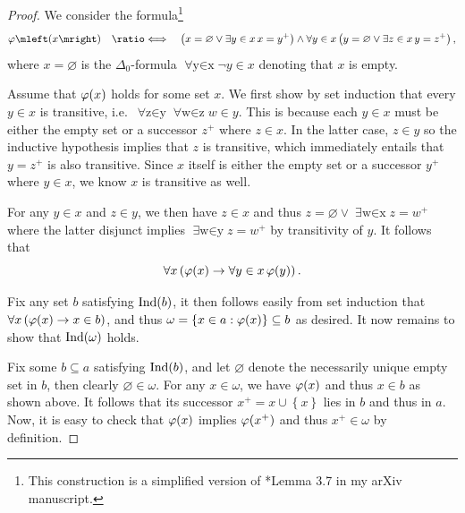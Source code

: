 \documentclass[12pt,openany]{book}
\theoremstyle{plain}
\theoremstyle{definition}
\newcommand\opA[1]{\mathop{\forall #1}}
\newcommand\opE[1]{\mathop{\exists #1}}
\newcommand\defeqv{\quad \ratio\Longleftrightarrow \quad}
\DeclareMathOperator\Ind{Ind}
\begin{document}
\begin{proof}
  We consider the formula\footnote{This construction is a simplified version of \cite{wang-sw26-plump}*{Lemma 3.7} in my arXiv manuscript.}
  \[\varphi\mleft(x\mright) \defeqv \left(x = \varnothing \lor \opE{y \in x} x = y^+\right) \land \opA{y \in x} \left(y = \varnothing \lor \opE{z \in x} y = z^+\right),\]
  where $x = \varnothing$ is the $\Delta_0$-formula $\opA{y \in x} \neg y \in x$ denoting that $x$ is empty.

  Assume that $\varphi\mleft(x\mright)$ holds for some set $x$. We first show by set induction that every $y \in x$ is transitive, i.e.\ $\opA{z \in y} \opA{w \in z} w \in y$. This is because each $y \in x$ must be either the empty set or a successor $z^+$ where $z \in x$. In the latter case, $z \in y$ so the inductive hypothesis implies that $z$ is transitive, which immediately entails that $y = z^+$ is also transitive. Since $x$ itself is either the empty set or a successor $y^+$ where $y \in x$, we know $x$ is transitive as well.

  For any $y \in x$ and $z \in y$, we then have $z \in x$ and thus $z = \varnothing \lor \opE{w \in x} z = w^+$ where the latter disjunct implies $\opE{w \in y} z = w^+$ by transitivity of $y$. It follows that
  \[\opA{x} \left(\varphi\mleft(x\mright) \rightarrow \opA{y \in x} \varphi\mleft(y\mright)\right).\]

  Fix any set $b$ satisfying $\Ind\mleft(b\mright)$, it then follows easily from set induction that $\opA{x} \left(\varphi\mleft(x\mright) \rightarrow x \in b\right)$, and thus $\omega = \left\{x \in a : \varphi\mleft(x\mright)\right\} \subseteq b$ as desired. It now remains to show that $\Ind\mleft(\omega\mright)$ holds.

  Fix some $b \subseteq a$ satisfying $\Ind\mleft(b\mright)$, and let $\varnothing$ denote the necessarily unique empty set in $b$, then clearly $\varnothing \in \omega$. For any $x \in \omega$, we have $\varphi\mleft(x\mright)$ and thus $x \in b$ as shown above. It follows that its successor $x^+ = x \cup \left\{x\right\}$ lies in $b$ and thus in $a$. Now, it is easy to check that $\varphi\mleft(x\mright)$ implies $\varphi\mleft(x^+\mright)$ and thus $x^+ \in \omega$ by definition.
\end{proof}
\end{document}
